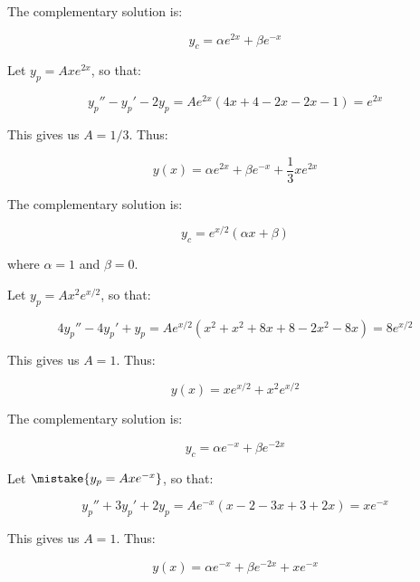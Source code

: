 \documentclass[12pt]{article}
\begin{document}
The complementary solution is:

\begin{equation}
    y_{c} = \alpha e^{2x} + \beta e^{-x}
\end{equation}

Let $y_{p} = Axe^{2x}$, so that:

\begin{equation}
    y_{p}'' - y_{p}' - 2y_{p} = Ae^{2x}(4x + 4 - 2x - 2x - 1) = e^{2x}
\end{equation}

This gives us $A = 1/3$. Thus:

\begin{equation}
    y(x) = \alpha e^{2x} + \beta e^{-x} + \frac{1}{3} xe^{2x}
\end{equation}

The complementary solution is:

\begin{equation}
    y_{c} = e^{x/2}(\alpha x + \beta)
\end{equation}

where $\alpha = 1$ and $\beta = 0$.

Let $y_{p} = Ax^{2}e^{x/2}$, so that:

\begin{equation}
    4y_{p}'' - 4y_{p}' + y_{p} = Ae^{x/2}(x^{2} + x^{2} + 8x + 8 - 2x^{2} - 8x) = 8e^{x/2}
\end{equation}

This gives us $A = 1$. Thus:

\begin{equation}
    y(x) = xe^{x/2} + x^{2} e^{x/2}
\end{equation}

The complementary solution is:

\begin{equation}
    y_{c} = \alpha e^{-x} + \beta e^{-2x}
\end{equation}

Let $\mistake{y_{p} = Axe^{-x}}$, so that:

\begin{equation}
    y_{p}'' + 3y_{p}' + 2y_{p} = Ae^{-x}(x - 2 - 3x + 3 + 2x) = xe^{-x}
\end{equation}

This gives us $A = 1$. Thus:

\begin{equation}
    y(x) = \alpha e^{-x} + \beta e^{-2x} + xe^{-x}
\end{equation}
\end{document}
